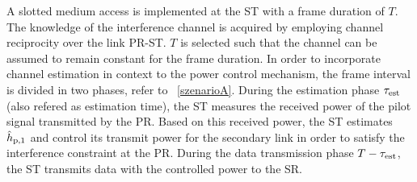 A slotted medium access is implemented at the ST with a frame duration of $T$. The knowledge of the interference channel is acquired by employing channel reciprocity over the link PR-ST. $T$ is selected such that the channel can be assumed to remain constant for the frame duration. %
In order to incorporate channel estimation in context to the power control mechanism, the frame interval is divided in two phases, refer to \figurename~\ref{szenarioA}. During the estimation phase $\tau_{\text{est}}$ (also refered as estimation time), the ST measures the received power of the pilot signal transmitted by the PR. Based on this received power, the ST estimates $\hat{h}_{\text{p,1}}$ and control its transmit power for the secondary link in order to satisfy the interference constraint at the PR. During the data transmission phase $T-\tau_{\text{est}}$, the ST transmits data with the controlled power to the SR.

